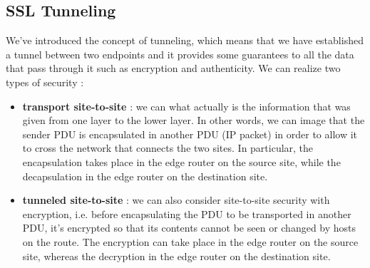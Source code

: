 \documentclass[11pt]{article}
\begin{document}
\subsection{SSL Tunneling}
We've introduced the concept of tunneling, which means that we have established a tunnel between two endpoints and it provides some guarantees to all the data that pass through it such as encryption and authenticity. We can realize two types of security :
\begin{itemize}
\item \textbf{transport site-to-site} : we can what actually is the information that was given from one layer to the lower layer. In other words, we can image that the sender PDU is encapsulated in another PDU (IP packet) in order to allow it to cross the network that connects the two sites. In particular, the encapsulation takes place in the edge router on the source site, while the decapsulation in the edge router on the destination site.
\item \textbf{tunneled site-to-site} : we can also consider site-to-site security with encryption, i.e. before encapsulating the PDU to be transported in another PDU, it's encrypted so that its contents cannot be seen or changed by hosts on the route. The encryption can take place in the edge router on the source site, whereas the decryption in the edge router on the destination site.
\end{itemize}
\end{document}

